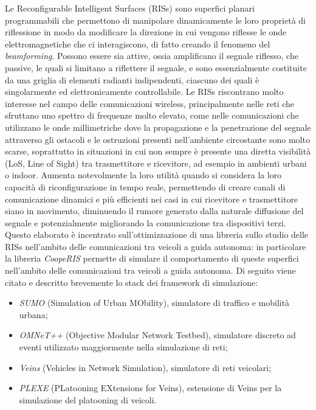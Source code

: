 Le Reconfigurable Intelligent Surfaces (RISs) sono superfici planari programmabili
che permettono di manipolare dinamicamente le loro proprietà di riflessione in modo
da modificare la direzione in cui vengono riflesse le onde elettromagnetiche che
ci interagiscono, di fatto creando il fenomeno del \textit{beamforming}. Possono
essere sia attive, ossia amplificano il segnale riflesso, che passive, le quali si
limitano a riflettere il segnale, e sono essenzialmente costituite da una
griglia di elementi radianti indipendenti, ciascuno dei quali è singolarmente ed
elettronicamente controllabile. Le RISs riscontrano molto interesse nel campo
delle comunicazioni wireless, principalmente nelle reti che sfruttano uno spettro
di frequenze molto elevato, come nelle comunicazioni che utilizzano le onde
millimetriche dove la propagazione e la penetrazione del segnale attraverso gli
ostacoli e le ostruzioni presenti nell'ambiente circostante sono molto scarse, soprattutto
in situazioni in cui non sempre è presente una diretta visibilità (LoS, Line of Sight)
tra trasmettitore e ricevitore, ad esempio in ambienti urbani o indoor. Aumenta
notevolmente la loro utilità quando si considera la loro capacità di
riconfigurazione in tempo reale, permettendo di creare canali di comunicazione dinamici
e più efficienti nei casi in cui ricevitore e trasmettitore siano in movimento,
diminuendo il rumore generato dalla naturale diffusione del segnale e
potenzialmente migliorando la comunicazione tra dispositivi terzi. Questo elaborato
è incentrato sull'ottimizzazione di una libreria sullo studio delle RISs nell'ambito
delle comunicazioni tra veicoli a guida autonoma: in particolare la libreria
\textit{CoopeRIS}\cite{cooperis} permette di simulare il comportamento di queste
superfici nell'ambito delle comunicazioni tra veicoli a guida autonoma. Di seguito
viene citato e descritto brevemente lo stack dei framework di simulazione:
\begin{itemize}
  \item \textit{SUMO} (Simulation of Urban MObility), simulatore di traffico e mobilità
    urbana\cite{sumo};

  \item \textit{OMNeT++} (Objective Modular Network Testbed), simulatore discreto
    ad eventi utilizzato maggiormente nella simulazione di reti\cite{omnetpp};

  \item \textit{Veins} (Vehicles in Network Simulation), simulatore di reti veicolari\cite{veins};

  \item \textit{PLEXE} (PLatooning EXtensions for Veins), estensione di Veins per
    la simulazione del platooning di veicoli\cite{plexe}.
\end{itemize}

